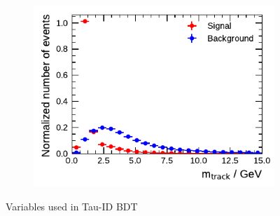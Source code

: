 \begin{figure}[!ht]
\begin{subfigure}{0.5\textwidth}
  \end{subfigure}%
  \begin{subfigure}{0.5\textwidth}
    \centering
    \includegraphics{./figures/baseline_bdt_vars/3p/massTrkSys.pdf}
  \end{subfigure}
  \caption{Variables used in Tau-ID BDT}
  \label{fig:bdt_vars_3p_overlays}
\end{figure}


